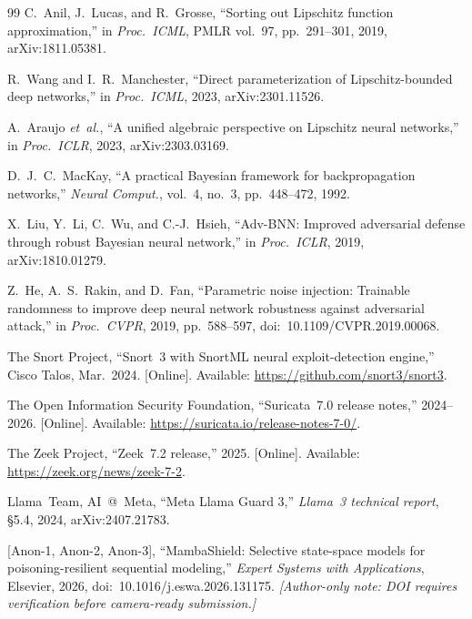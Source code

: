 \documentclass[journal,10pt]{IEEEtran}
\theoremstyle{definition}
\theoremstyle{remark}
\begin{document}
\begin{thebibliography}{99}
 C.~Anil, J.~Lucas, and R.~Grosse,
``Sorting out Lipschitz function approximation,'' in \emph{Proc.\ ICML},
PMLR vol.~97, pp.~291--301, 2019, arXiv:1811.05381.

 R.~Wang and I.~R.~Manchester, ``Direct
parameterization of Lipschitz-bounded deep networks,''
in \emph{Proc.\ ICML}, 2023, arXiv:2301.11526.

 A.~Araujo \textit{et~al.}, ``A unified
algebraic perspective on Lipschitz neural networks,''
in \emph{Proc.\ ICLR}, 2023, arXiv:2303.03169.

 D.~J.~C.~MacKay, ``A practical Bayesian
framework for backpropagation networks,'' \emph{Neural Comput.},
vol.~4, no.~3, pp.~448--472, 1992.

 X.~Liu, Y.~Li, C.~Wu, and C.-J.~Hsieh,
``Adv-BNN: Improved adversarial defense through robust Bayesian
neural network,'' in \emph{Proc.\ ICLR}, 2019, arXiv:1810.01279.

 Z.~He, A.~S.~Rakin, and D.~Fan,
``Parametric noise injection: Trainable randomness to improve deep
neural network robustness against adversarial attack,''
in \emph{Proc.\ CVPR}, 2019, pp.~588--597,
doi:~10.1109/CVPR.2019.00068.

 The Snort Project, ``Snort~3 with SnortML neural
exploit-detection engine,'' Cisco Talos, Mar.~2024.
[Online]. Available: \url{https://github.com/snort3/snort3}.

 The Open Information Security Foundation,
``Suricata~7.0 release notes,'' 2024--2026.
[Online]. Available: \url{https://suricata.io/release-notes-7-0/}.

 The Zeek Project, ``Zeek~7.2 release,'' 2025.
[Online]. Available: \url{https://zeek.org/news/zeek-7-2}.

 Llama~Team, AI~@~Meta, ``Meta Llama Guard 3,''
\emph{Llama~3 technical report}, \S5.4, 2024, arXiv:2407.21783.

 [Anon-1, Anon-2, Anon-3], ``MambaShield:
Selective state-space models for poisoning-resilient sequential
modeling,'' \emph{Expert Systems with Applications}, Elsevier, 2026,
doi:~10.1016/j.eswa.2026.131175. \emph{[Author-only note: DOI requires
verification before camera-ready submission.]}


\end{thebibliography}
\end{document}
